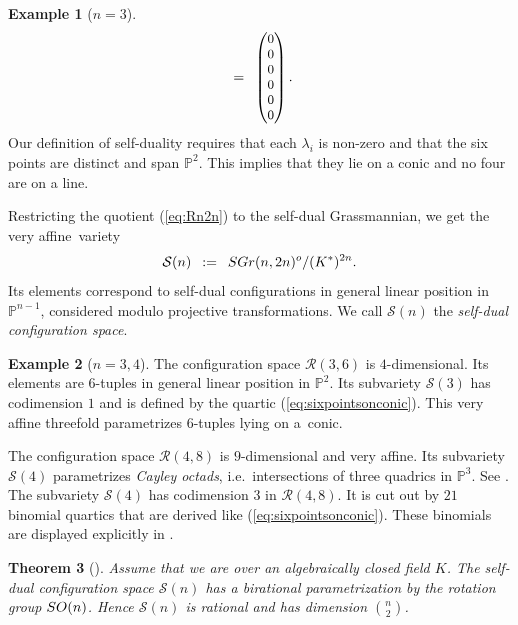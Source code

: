 \documentclass[12pt]{extarticle}
\newtheorem{theorem}{Theorem}
\theoremstyle{definition}
\newtheorem{example}[theorem]{Example}
\numberwithin{theorem}{section}
\theoremstyle{plain}\newtheorem{ithm}{Theorem}
\newcommand{\PP}{\mathbb{P}}
\begin{document}
\begin{example}[$n=3$]
\begin{equation}
\begin{small}
\,\,\, = \,\,\,
\begin{pmatrix} 0 \\ 0 \\ 0 \\ 0 \\ 0 \\ 0 \end{pmatrix}.
\end{small}
\end{equation}
Our definition of self-duality requires that each $\lambda_i$ is non-zero and that the six points are distinct and span $\PP^2$.
This implies that they lie on a conic and no four are on a line.
\end{example}

Restricting the quotient (\ref{eq:Rn2n}) to the self-dual Grassmannian, we get the very affine~variety
\begin{equation}
\label{eq:Sn2n}
 \mathcal{S}(n) \,\,\, := \,\,\, {\rm SGr}(n,2n)^o/(K^*)^{2n}. 
 \end{equation}
Its elements correspond
to self-dual configurations
in general linear position  in $\PP^{n-1}$, considered modulo projective transformations.
We call $ \mathcal{S}(n)$ the  {\em self-dual configuration space}.

\begin{example}[$n=3,4$] \label{ex:34}
The configuration space $\mathcal{R}(3,6) $
is $4$-dimensional. Its elements are 6-tuples in general linear position in $\PP^2$.
Its subvariety $\mathcal{S}(3)$ has codimension $1$ and is defined by
the quartic (\ref{eq:sixpointsonconic}).
This very affine threefold  parametrizes  6-tuples lying on a~conic.

The configuration space $\mathcal{R}(4,8)$ is $9$-dimensional and very affine. Its subvariety 
$\mathcal{S}(4)$ parametrizes  {\em Cayley octads}, i.e.~intersections of three quadrics in $\PP^3$.
See \cite[pages 48 and 107]{DO}. 
The subvariety  $\mathcal{S}(4)$ has codimension $3$ in
$\mathcal{R}(4,8)$. It is cut out by
$21$ binomial quartics that are derived like (\ref{eq:sixpointsonconic}).
These binomials are displayed explicitly in \cite[Proposition 7.2]{PSV}.
\end{example}





\begin{theorem}[{\cite[Theorem~4, p.~51]{DO}}] \label{thm:SOn}
Assume that we are over an algebraically closed field $K$.
The self-dual configuration space
$\mathcal{S}(n)$ has
a  birational parametrization by
the rotation group ${\rm SO}(n)$. Hence
$\mathcal{S}(n)$ is rational and  has dimension $\binom{n}{2}$.
\end{theorem}
\end{document}
